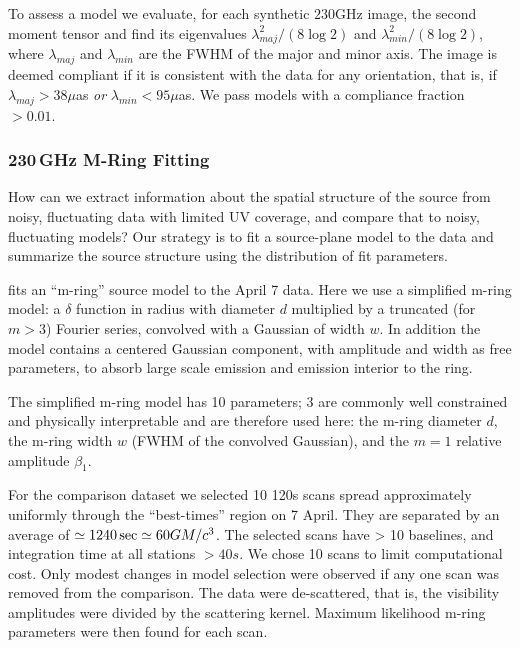 To assess a model we evaluate, for each synthetic $230$GHz image, the second moment tensor and find its eigenvalues $\lambda_{maj}^2/(8\log 2)$ and $\lambda_{min}^2/(8\log 2)$, where $\lambda_{maj}$ and $\lambda_{min}$ are the FWHM of the major and minor axis.  The image is deemed compliant if it is consistent with the data for any orientation, that is, if $\lambda_{maj} > 38\mu$as {\em or} $\lambda_{min} < 95\mu$as.  We pass models with a compliance fraction $ > 0.01$.   

\subsubsection{230\,GHz M-Ring Fitting}

How can we extract information about the spatial structure of the source from noisy, fluctuating data with limited UV coverage, and compare that to noisy, fluctuating models? Our strategy is to fit a source-plane model to the data and summarize the source structure using the distribution of fit parameters.

 fits an ``m-ring'' source model to the April 7 data.  Here we use a simplified m-ring model: a $\delta$ function in radius with diameter $d$ multiplied by a truncated (for $m > 3$) Fourier series, convolved with a Gaussian of width $w$.  In addition the model contains a centered Gaussian component, with amplitude and width as free parameters, to absorb large scale emission and emission interior to the ring.

The simplified m-ring model has 10 parameters; 3 are commonly well constrained and physically interpretable and are therefore used here: the m-ring diameter $d$, the m-ring width $w$ (FWHM of the convolved Gaussian), and the $m=1$ relative amplitude $\beta_1$.

For the comparison dataset we selected 10 120s scans spread approximately uniformly through the ``best-times'' region on 7 April.  They are separated by an average of $\simeq 1240\sec \simeq 60 GM/c^3$. The selected scans have > 10 baselines, and integration time at all stations $> 40s$.  We chose 10 scans to limit computational cost.   Only modest changes in model selection were observed if any one scan was removed from the comparison.  The data were de-scattered, that is, the visibility amplitudes were divided by the scattering kernel.  Maximum likelihood m-ring parameters were then found for each scan.

